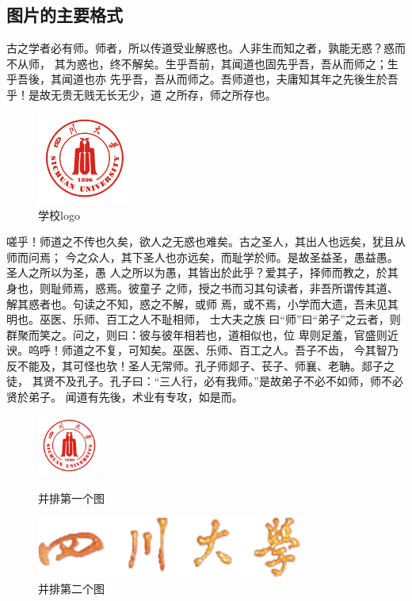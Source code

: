 \subsection{图片的主要格式}
古之学者必有师。师者，所以传道受业解惑也。人非生而知之者，孰能无惑？惑而不从师，
其为惑也，终不解矣。生乎吾前，其闻道也固先乎吾，吾从而师之；生乎吾後，其闻道也亦
先乎吾，吾从而师之。吾师道也，夫庸知其年之先後生於吾乎！是故无贵无贱无长无少，道
之所存，师之所存也。
\begin{figure}[ht]
  \centering%
  \includegraphics[height=3cm]{images/logo}
  \caption{学校logo}
\end{figure}

嗟乎！师道之不传也久矣，欲人之无惑也难矣。古之圣人，其出人也远矣，犹且从师而问焉；
今之众人，其下圣人也亦远矣，而耻学於师。是故圣益圣，愚益愚。圣人之所以为圣，愚
人之所以为愚，其皆出於此乎？爱其子，择师而教之，於其身也，则耻师焉，惑焉。彼童子
之师，授之书而习其句读者，非吾所谓传其道、解其惑者也。句读之不知，惑之不解，或师
焉，或不焉，小学而大遗，吾未见其明也。巫医、乐师、百工之人不耻相师，  士大夫之族
曰“师”曰“弟子”之云者，则群聚而笑之。问之，则曰：彼与彼年相若也，道相似也，位
卑则足羞，官盛则近谀。呜呼！师道之不复，可知矣。巫医、乐师、百工之人。吾子不齿，
今其智乃反不能及，其可怪也欤！圣人无常师。孔子师郯子、苌子、师襄、老聃。郯子之徒，
其贤不及孔子。孔子曰：“三人行，必有我师。”是故弟子不必不如师，师不必贤於弟子。
闻道有先後，术业有专攻，如是而。

\begin{figure}[htb]
	\begin{minipage}{.40\textwidth}
	  \centering
	  \includegraphics[height=2cm]{images/logo}
	  \caption{并排第一个图}
	  \label{fig:parallel1}
	\end{minipage}
	\begin{minipage}{.55\textwidth}
	  \centering
	  \includegraphics[height=2cm]{images/scu}
	  \caption{并排第二个图}
	  \label{fig:parallel2}
	\end{minipage}
\end{figure}